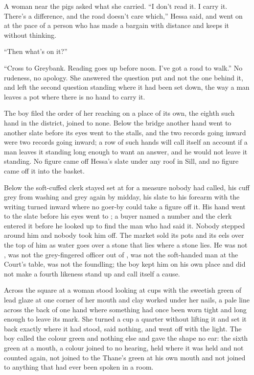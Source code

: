 A woman near the pigs asked what she carried. “I don't read it. I carry it. There's a difference, and the road doesn't care which,” Hessa said, and went on at the pace of a person who has made a bargain with distance and keeps it without thinking.

“Then what's on it?”

“Cross to Greybank. Reading goes up before noon. I've got a road to walk.” No rudeness, no apology. She answered the question put and not the one behind it, and left the second question standing where it had been set down, the way a man leaves a pot where there is no hand to carry it.

The boy filed the order of her reaching on a place of its own, the eighth such hand in the district, joined to none. Below the bridge another hand went to another slate before its eyes went to the stalls, and the two records going inward were two records going inward; a row of such hands will call itself an account if a man leaves it standing long enough to want an answer, and he would not leave it standing. No figure came off Hessa's slate under any roof in Sill, and no figure came off it into the basket.

Below  the soft-cuffed clerk stayed set at  for a measure nobody had called, his cuff grey from washing and grey again by midday, his slate to his forearm with the writing turned inward where no goer-by could take a figure off it. His hand went to the slate before his eyes went to ; a buyer named a number and the clerk entered it before he looked up to find the man who had said it. Nobody stepped around him and nobody took him off. The market sold its pots and its eels over the top of him as water goes over a stone that lies where a stone lies. He was not , was not the grey-fingered officer out of , was not the soft-handed man at the Court's table, was not the foundling; the boy kept him on his own place and did not make a fourth likeness stand up and call itself a cause.

Across the square at  a woman stood looking at cups with the sweetish green of lead glaze at one corner of her mouth and clay worked under her nails, a pale line across the back of one hand where something had once been worn tight and long enough to leave its mark. She turned a cup a quarter without lifting it and set it back exactly where it had stood, said nothing, and went off with the light. The boy called the colour green and nothing else and gave the shape no ear: the sixth green at a mouth, a colour joined to no hearing, held where it was held and not counted again, not joined to the Thane's green at his own mouth and not joined to anything that had ever been spoken in a room.

